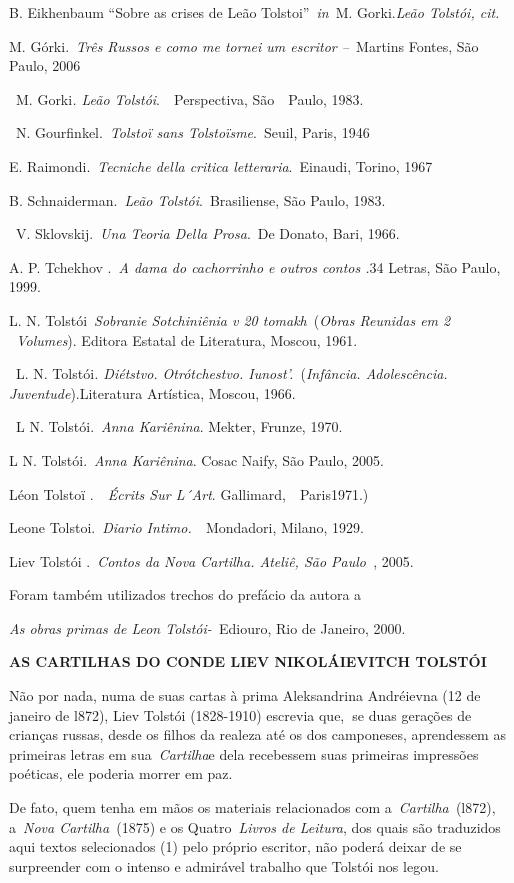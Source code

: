 B. Eikhenbaum ``Sobre as crises de Leão Tolstoi''~\emph{in~}M.
Gorki.\emph{Leão Tolstói, cit.}

M. Górki.~\emph{Três Russos e como me tornei um escritor --~}Martins
Fontes, São Paulo, 2006

~M. Gorki\emph{. Leão Tolstói}.~~Perspectiva, São~~Paulo, 1983.

~N. Gourfinkel.~\emph{Tolstoï sans Tolstoïsme}.~Seuil, Paris, 1946

E. Raimondi.~\emph{Tecniche della critica letteraria}.~Einaudi, Torino,
1967

B. Schnaiderman.~\emph{Leão Tolstói}.~Brasiliense, São Paulo, 1983.

~V. Sklovskij.~\emph{Una Teoria Della Prosa}.~De Donato, Bari, 1966.

A. P. Tchekhov .~\emph{A dama do cachorrinho e outros contos .}34
Letras, São Paulo, 1999.

L. N. Tolstói~\emph{Sobranie Sotchiniênia v 20 tomakh}~(\emph{Obras
Reunidas em 2 ~Volumes}). Editora Estatal de Literatura, Moscou, 1961.

~L. N. Tolstói\emph{. Diétstvo. Otrótchestvo. Iunost'.}~(\emph{Infância.
Adolescência.~~~} \emph{Juventude}).Literatura Artística, Moscou, 1966.

~L N. Tolstói.~\emph{Anna Kariênina}. Mekter, Frunze, 1970.

L N. Tolstói.~\emph{Anna Kariênina}. Cosac Naify, São Paulo, 2005.

Léon Tolstoï .~\emph{~Écrits Sur L´Art}. Gallimard,~~Paris1971.)

Leone Tolstoi.~\emph{Diario Intimo.~}~Mondadori, Milano, 1929.

Liev Tolstói .~\emph{Contos da Nova Cartilha. Ateliê, São Paulo~},
2005.~

Foram também utilizados trechos do prefácio da autora a

\emph{As obras primas de Leon Tolstói-~}Ediouro, Rio de Janeiro, 2000.

\textbf{AS CARTILHAS DO CONDE LIEV NIKOLÁIEVITCH TOLSTÓI}

Não por nada, numa de suas cartas à prima Aleksandrina Andréievna (12 de
janeiro de l872), Liev Tolstói (1828-1910) escrevia que,\textbf{~}se
duas gerações de crianças russas, desde os filhos da realeza até os dos
camponeses, aprendessem as primeiras letras em sua~\emph{Cartilha}e dela
recebessem suas primeiras impressões poéticas, ele poderia morrer em
paz.

De fato, quem tenha em mãos os materiais relacionados com
a~\emph{Cartilha~}(l872), a~\emph{Nova Cartilha~}(1875) e os
Quatro~\emph{Livros de Leitura}, dos quais são traduzidos aqui textos
selecionados (1) pelo próprio escritor, não poderá deixar de se
surpreender com o intenso e admirável trabalho que Tolstói nos legou.

